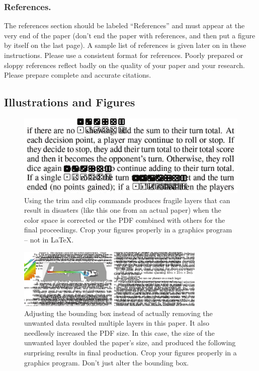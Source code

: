 \subsubsection{References.}

The references section should be labeled ``References'' and must appear
at the very end of the paper (don't end the paper with references, and
then put a figure by itself on the last page). A sample list of
references is given later on in these instructions. Please use a
consistent format for references. Poorly prepared or sloppy references
reflect badly on the quality of your paper and your research. Please
prepare complete and accurate citations.

\subsection{Illustrations and  Figures}

\begin{figure}[t]
\centering
\includegraphics[width=0.9\columnwidth]{figure1} %
\caption{Using the trim and clip commands produces fragile layers that can result in disasters (like this one from an actual paper) when the color space is corrected or the PDF combined with others for the final proceedings. Crop your figures properly in a graphics program -- not in LaTeX.}
\label{fig1}
\end{figure}

\begin{figure}[t]
\centering
\includegraphics[width=0.8\textwidth]{figure2} %
\caption{Adjusting the bounding box instead of actually removing the unwanted data resulted multiple layers in this paper. It also needlessly increased the PDF size. In this case, the size of the unwanted layer doubled the paper's size, and produced the following surprising results in final production. Crop your figures properly in a graphics program. Don't just alter the bounding box.}
\label{fig2}
\end{figure}

